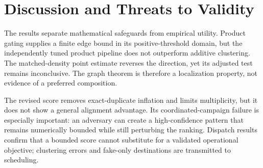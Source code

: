 \documentclass[runningheads]{llncs}
\begin{document}
\begin{table}[t]
\centering\scriptsize
\caption{Candidate-4.1 one-at-a-time sensitivity of mean NDCG@5 to fixed
heuristic constants. Each range is the minimum--maximum mean over the tested
levels, including the reference level, on 40 test seeds. All spans are below
0.01 under the locked rerun.}
\label{tab:sensitivity}
\end{table}

\section{Discussion and Threats to Validity}

The results separate mathematical safeguards from empirical utility. Product
gating supplies a finite edge bound in its positive-threshold domain, but the
independently tuned product pipeline does not outperform additive clustering.
The matched-density point estimate reverses the direction, yet its adjusted
test remains inconclusive. The graph theorem is therefore a localization
property, not evidence of a preferred composition.

The revised score removes exact-duplicate inflation and limits multiplicity,
but it does not show a general alignment advantage. Its coordinated-campaign
failure is especially important: an adversary can create a high-confidence
pattern that remains numerically bounded while still perturbing the ranking.
Dispatch results confirm that a bounded score cannot substitute for a
validated operational objective; clustering errors and fake-only destinations
are transmitted to scheduling.
\end{document}
